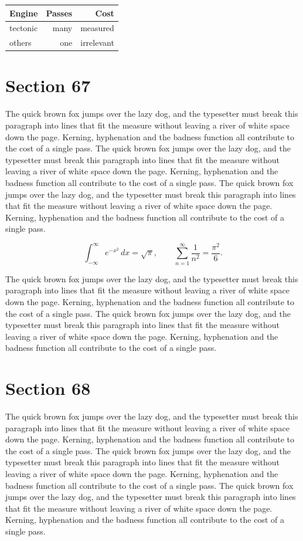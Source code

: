 \documentclass{article}
\begin{document}
\begin{center}
\begin{tabular}{lrr}
\toprule
Engine & Passes & Cost \\
\midrule
tectonic & many & measured \\
others & one & irrelevant \\
\bottomrule
\end{tabular}
\end{center}

\section{Section 67}
The quick brown fox jumps over the lazy dog, and the typesetter must break this paragraph into lines that fit the measure without leaving a river of white space down the page. Kerning, hyphenation and the badness function all contribute to the cost of a single pass. The quick brown fox jumps over the lazy dog, and the typesetter must break this paragraph into lines that fit the measure without leaving a river of white space down the page. Kerning, hyphenation and the badness function all contribute to the cost of a single pass. The quick brown fox jumps over the lazy dog, and the typesetter must break this paragraph into lines that fit the measure without leaving a river of white space down the page. Kerning, hyphenation and the badness function all contribute to the cost of a single pass. 

\begin{equation}
\int_{-\infty}^{\infty} e^{-x^{2}}\,dx = \sqrt{\pi}, \qquad
\sum_{n=1}^{\infty} \frac{1}{n^{2}} = \frac{\pi^{2}}{6}.
\end{equation}

The quick brown fox jumps over the lazy dog, and the typesetter must break this paragraph into lines that fit the measure without leaving a river of white space down the page. Kerning, hyphenation and the badness function all contribute to the cost of a single pass. The quick brown fox jumps over the lazy dog, and the typesetter must break this paragraph into lines that fit the measure without leaving a river of white space down the page. Kerning, hyphenation and the badness function all contribute to the cost of a single pass. 
\section{Section 68}
The quick brown fox jumps over the lazy dog, and the typesetter must break this paragraph into lines that fit the measure without leaving a river of white space down the page. Kerning, hyphenation and the badness function all contribute to the cost of a single pass. The quick brown fox jumps over the lazy dog, and the typesetter must break this paragraph into lines that fit the measure without leaving a river of white space down the page. Kerning, hyphenation and the badness function all contribute to the cost of a single pass. The quick brown fox jumps over the lazy dog, and the typesetter must break this paragraph into lines that fit the measure without leaving a river of white space down the page. Kerning, hyphenation and the badness function all contribute to the cost of a single pass. 
\end{document}
